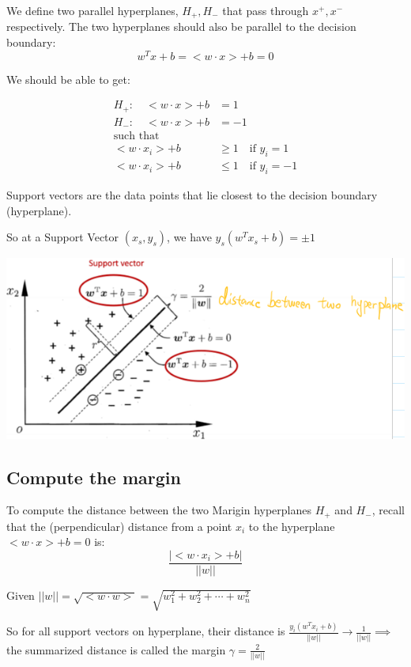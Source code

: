 \documentclass[letterpaper,12pt]{article}
\begin{document}
We define two parallel hyperplanes, $H_+, H_-$ that pass through $x^+,x^-$
respectively. The two hyperplanes should also be parallel to the decision
boundary:
\[
    w^T x+b=<w\cdot x>+b=0
\]

We should be able to get:

\begin{align*}
    H_+: \quad <w\cdot x>+b & =1                           \\
    H_-: \quad <w\cdot x>+b & =-1                          \\
    \text{such that}                                       \\
    <w\cdot x_i>+b          & \ge 1 \quad \text{if }y_i=1  \\
    <w\cdot x_i>+b          & \le 1 \quad \text{if }y_i=-1
\end{align*}

Support vectors are the data points that lie closest to the decision boundary
(hyperplane).

So at a Support Vector $(x_s,y_s)$, we have $y_s(w^T x_s+b)=\pm 1$

\includegraphics*{./Image/Support vector.png}

\subsection{Compute the margin}
To compute the distance between the two Marigin hyperplanes $H_+$ and $H_-$,
recall that the (perpendicular) distance from a point $x_i$ to the hyperplane
$<w\cdot x>+b=0 $ is:
\[
    \frac{|<w\cdot x_i>+b|}{||w||}
\]

Given $||w||=\sqrt{<w\cdot w>}=\sqrt{w_1^2+w_2^2+\cdots+w_n^2}$

So for all support vectors on hyperplane, their distance is $\frac{y_i(w^T x_i
        +b)}{||w||}\to \frac{1}{||w||}\implies $ the summarized distance is called the
margin $\gamma = \frac{2}{||w||}$
\end{document}
